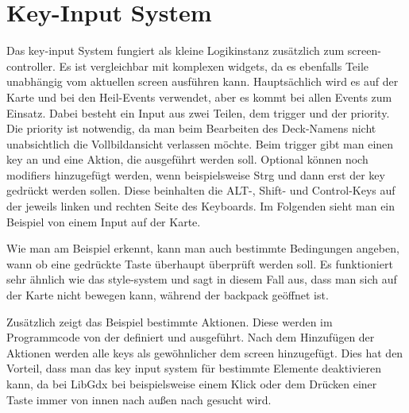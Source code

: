 \renewcommand{\kapitelautor}{Autor: Felix Zwickelstorfer}


\section{Key-Input System}\label{sec:key-input-system}
\renewcommand{\kapitelautor}{Autor: Felix Zwickelstorfer}

Das key-input System fungiert als kleine Logikinstanz zusätzlich zum screen-controller.
Es ist vergleichbar mit komplexen widgets, da es ebenfalls Teile unabhängig vom aktuellen screen ausführen kann.
Hauptsächlich wird es auf der Karte und bei den Heil-Events verwendet, aber es kommt bei allen Events zum Einsatz.
Dabei besteht ein Input aus zwei Teilen, dem trigger und der priority.
Die priority ist notwendig, da man \zB beim Bearbeiten des Deck-Namens nicht unabsichtlich die Vollbildansicht verlassen möchte.
Beim trigger gibt man einen key an und eine Aktion, die ausgeführt werden soll.
Optional können noch modifiers hinzugefügt werden, wenn beispielsweise Strg und dann erst der key gedrückt werden sollen.
Diese beinhalten die ALT-, Shift- und Control-Keys auf der jeweils linken und rechten Seite des Keyboards.
Im Folgenden sieht man ein Beispiel von einem Input auf der Karte.

Wie man am Beispiel erkennt, kann man auch bestimmte Bedingungen angeben, wann \bzw ob eine gedrückte Taste überhaupt überprüft werden soll.
Es funktioniert sehr ähnlich wie das style-system und sagt in diesem Fall aus, dass man sich auf der Karte nicht bewegen kann, während der backpack geöffnet ist.

Zusätzlich zeigt das Beispiel bestimmte Aktionen.
Diese werden im Programmcode von der  definiert und ausgeführt.
Nach dem Hinzufügen der Aktionen werden alle keys als gewöhnlicher  dem screen hinzugefügt.
Dies hat den Vorteil, dass man das key input system für bestimmte Elemente deaktivieren kann, da bei LibGdx bei beispielsweise einem Klick oder dem Drücken einer Taste immer von innen nach außen nach  gesucht wird.